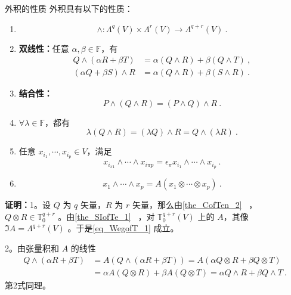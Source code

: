 \begin{theorem}{外积的性质}
外积具有以下的性质：
\begin{enumerate}
\item \begin{equation}\label{eq_WegofT_1}
\wedge:\Lambda^q(V)\times\Lambda^r(V)\rightarrow\Lambda^{q+r}(V)~.
\end{equation}
\item \textbf{双线性：}任意 $\alpha,\beta\in\mathbb F$，有
\begin{equation}
\begin{aligned}
Q\wedge(\alpha R+\beta T)&=\alpha(Q\wedge R)+\beta(Q\wedge T)~,\\
(\alpha Q+\beta S)\wedge R&=\alpha (Q\wedge R)+\beta (S\wedge R)~.
\end{aligned}
\end{equation}
\item \textbf{结合性：}
\begin{equation}
P\wedge (Q\wedge R)=(P\wedge Q)\wedge R~.
\end{equation}
\item $\forall \lambda\in\mathbb F$，都有
\begin{equation}\label{eq_WegofT_4}
\lambda(Q\wedge R)=(\lambda Q)\wedge R=Q\wedge(\lambda R)~.
\end{equation}

\item 任意 $x_{i_1},\cdots,x_{i_p}\in V$，满足
\begin{equation}\label{eq_WegofT_6}
x_{i_{\pi 1}}\wedge\cdots \wedge x_{i\pi p}=\epsilon_\pi x_{i_1}\wedge\cdots\wedge x_{i_p}~.
\end{equation}
\item 
\begin{equation}\label{eq_WegofT_5}
x_1\wedge\cdots\wedge x_p=A(x_1\otimes\cdots\otimes x_p)~.
\end{equation}
\end{enumerate}

\end{theorem}
\textbf{证明：}1。设 $Q$ 为 $q$ 矢量，$R$ 为 $r$ 矢量，那么由\autoref{the_CofTen_2}~ ， $Q\otimes R\in\mathbb T_0^{q+r}$ 。由\autoref{the_SIofTe_1}~ ，对 $\mathbb T_0^{q+r}(V)$ 上的 $A$，其像 $\Im A=\Lambda ^{q+r}(V)$ 。于是\autoref{eq_WegofT_1} 成立。

2。由张量积和 $A$ 的线性
\begin{equation}
\begin{aligned}
Q\wedge(\alpha R+\beta T)&=A(Q\wedge(\alpha R+\beta T))=A(\alpha Q\otimes R+\beta Q\otimes T)\\
&=\alpha A(Q\otimes R)+\beta A(Q\otimes T)=\alpha Q\wedge R+\beta Q\wedge T~.
\end{aligned}
\end{equation}
第2式同理。


